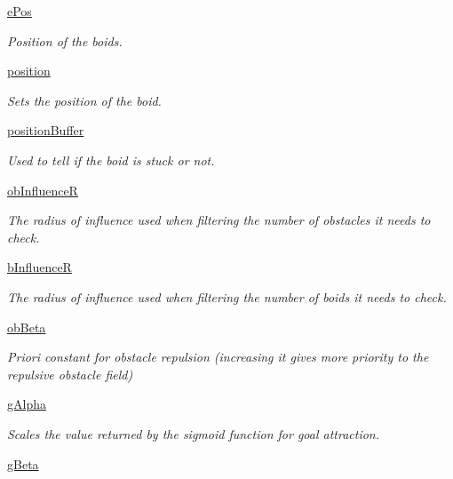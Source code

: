 \begin{DoxyCompactItemize}
\hyperlink{classboid_1_1Boid_a15b3d73058c73aed19d2e9fb0266805d}{e\-Pos}
\begin{DoxyCompactList}\small\item\em Position of the boids. \end{DoxyCompactList}\item 
\hyperlink{classboid_1_1Boid_a483cb30093bc500a6123d5a801247ad5}{position}
\begin{DoxyCompactList}\small\item\em Sets the position of the boid. \end{DoxyCompactList}\item 
\hyperlink{classboid_1_1Boid_ab6c778a50dd384fabc6aa48be04c0988}{position\-Buffer}
\begin{DoxyCompactList}\small\item\em Used to tell if the boid is stuck or not. \end{DoxyCompactList}\item 
\hyperlink{classboid_1_1Boid_abc5327f9ad46170e5f57d89c2c6e18e9}{ob\-Influence\-R}
\begin{DoxyCompactList}\small\item\em The radius of influence used when filtering the number of obstacles it needs to check. \end{DoxyCompactList}\item 
\hyperlink{classboid_1_1Boid_ae1a1d62fdc0e9014df5fcb1a49d37342}{b\-Influence\-R}
\begin{DoxyCompactList}\small\item\em The radius of influence used when filtering the number of boids it needs to check. \end{DoxyCompactList}\item 
\hyperlink{classboid_1_1Boid_a222ad56335a1e1ea39dd6da9e21797c5}{ob\-Beta}
\begin{DoxyCompactList}\small\item\em Priori constant for obstacle repulsion (increasing it gives more priority to the repulsive obstacle field) \end{DoxyCompactList}\item 
\hyperlink{classboid_1_1Boid_a5090639a7e3a489c8dc83bd12b6d1653}{g\-Alpha}
\begin{DoxyCompactList}\small\item\em Scales the value returned by the sigmoid function for goal attraction. \end{DoxyCompactList}\item 
\hyperlink{classboid_1_1Boid_a2c33a265be5079b7b916be49933eccaf}{g\-Beta}

\end{DoxyCompactItemize}
